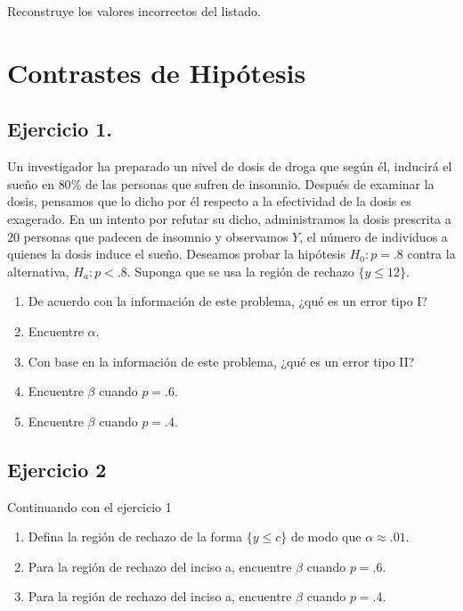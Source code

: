\documentclass[
]{article}
\providecommand{\tightlist}{%
  \setlength{\itemsep}{0pt}\setlength{\parskip}{0pt}}
\begin{document}
Reconstruye los valores incorrectos del listado.

\section{Contrastes de Hipótesis}\label{contrastes-de-hipuxf3tesis}

\subsection{Ejercicio 1.}\label{ejercicio-1.}

Un investigador ha preparado un nivel de dosis de droga que según él, inducirá el sueño en \(80 \%\) de las personas que sufren de insomnio. Después de examinar la dosis, pensamos que lo dicho por él respecto a la efectividad de la dosis es exagerado. En un intento por refutar su dicho, administramos la dosis prescrita a 20 personas que padecen de insomnio y observamos \(Y\), el número de individuos a quienes la dosis induce el sueño. Deseamos probar la hipótesis \(H_{0}: p=.8\) contra la alternativa, \(H_{a}: p<.8\). Suponga que se usa la región de rechazo \(\{y \leq 12\}\).

\begin{enumerate}
\def\labelenumi{\alph{enumi}.}
\tightlist
\item
  De acuerdo con la información de este problema, ¿qué es un error tipo I?
\item
  Encuentre \(\alpha\).
\item
  Con base en la información de este problema, ¿qué es un error tipo II?
\item
  Encuentre \(\beta\) cuando \(p=.6\).
\item
  Encuentre \(\beta\) cuando \(p=.4\).
\end{enumerate}

\subsection{Ejercicio 2}\label{ejercicio-2-4}

Continuando con el ejercicio 1

\begin{enumerate}
\def\labelenumi{\alph{enumi}.}
\tightlist
\item
  Defina la región de rechazo de la forma \(\{y \leq c\}\) de modo que \(\alpha \approx .01\).
\item
  Para la región de rechazo del inciso a, encuentre \(\beta\) cuando \(p=.6\).
\item
  Para la región de rechazo del inciso a, encuentre \(\beta\) cuando \(p=.4\).
\end{enumerate}
\end{document}
